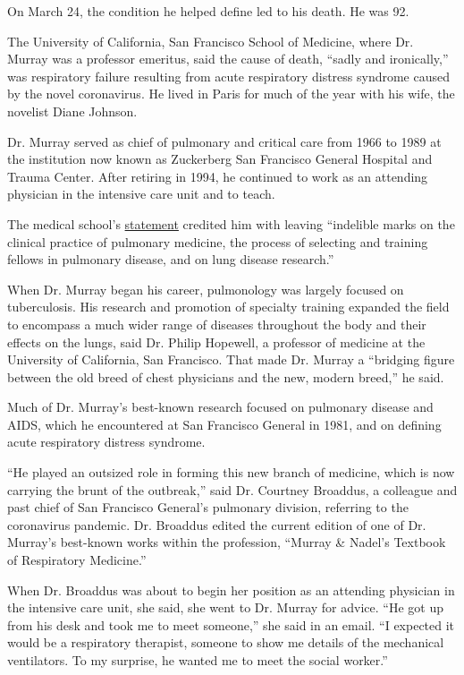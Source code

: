 On March 24, the condition he helped define led to his death. He was 92.

The University of California, San Francisco School of Medicine, where
Dr. Murray was a professor emeritus, said the cause of death, ``sadly
and ironically,'' was respiratory failure resulting from acute
respiratory distress syndrome caused by the novel coronavirus. He lived
in Paris for much of the year with his wife, the novelist Diane Johnson.

Dr. Murray served as chief of pulmonary and critical care from 1966 to
1989 at the institution now known as Zuckerberg San Francisco General
Hospital and Trauma Center. After retiring in 1994, he continued to work
as an attending physician in the intensive care unit and to teach.

The medical school's
\href{https://medschool.ucsf.edu/remembering-john-f-murray-md}{statement}
credited him with leaving ``indelible marks on the clinical practice of
pulmonary medicine, the process of selecting and training fellows in
pulmonary disease, and on lung disease research.''

When Dr. Murray began his career, pulmonology was largely focused on
tuberculosis. His research and promotion of specialty training expanded
the field to encompass a much wider range of diseases throughout the
body and their effects on the lungs, said Dr. Philip Hopewell, a
professor of medicine at the University of California, San Francisco.
That made Dr. Murray a ``bridging figure between the old breed of chest
physicians and the new, modern breed,'' he said.

Much of Dr. Murray's best-known research focused on pulmonary disease
and AIDS, which he encountered at San Francisco General in 1981, and on
defining acute respiratory distress syndrome.

``He played an outsized role in forming this new branch of medicine,
which is now carrying the brunt of the outbreak,'' said Dr. Courtney
Broaddus, a colleague and past chief of San Francisco General's
pulmonary division, referring to the coronavirus pandemic. Dr. Broaddus
edited the current edition of one of Dr. Murray's best-known works
within the profession, ``Murray \& Nadel's Textbook of Respiratory
Medicine.''

When Dr. Broaddus was about to begin her position as an attending
physician in the intensive care unit, she said, she went to Dr. Murray
for advice. ``He got up from his desk and took me to meet someone,'' she
said in an email. ``I expected it would be a respiratory therapist,
someone to show me details of the mechanical ventilators. To my
surprise, he wanted me to meet the social worker.''

